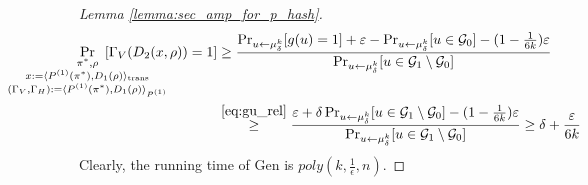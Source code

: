 \begin{proof}[Lemma \ref{lemma:sec_amp_for_p_hash}]
\begin{align}
   \label{eq:proof_final}
\underset{
  \mathclap{
  \substack{\pi^*, \rho \\ x := \langle P^{(1)}(\pi^*), D_1(\rho) \rangle_{\text{trans}}
    \\ (\Gamma_V, \Gamma_H) := \langle P^{(1)}(\pi^*), D_1 (\rho) \rangle_{P^{(1)}} }}}
{\Pr}\mkern13mu[\Gamma_V(D_2(x, \rho)) = 1]
 &\geq \frac{ {\Pr}_{u \leftarrow \mu_{\delta}^{k}}[g(u) = 1] + \epsilon -
 \Pr_{u \leftarrow \mu_{\delta}^{k}}[u \in \cG_0] - (1 - \frac{1}{6k})\epsilon} {\Pr_{u \leftarrow \mu_{\delta}^{k}}[u \in \cG_1 \setminus \cG_0]} \notag\\
 &\stackrel{\eqref{eq:gu_rel}}{\geq} \frac{\epsilon + \delta\Pr_{u \leftarrow \mu_{\delta}^{k}}[u \in \cG_1 \setminus \cG_0] - (1 - \frac{1}{6k})\epsilon}
{\Pr_{u \leftarrow \mu_{\delta}^{k}}[u \in \cG_1 \setminus \cG_0]} \geq \delta + \frac{\epsilon}{6k}
\end{align}
Clearly, the running time of Gen is $poly(k, \frac{1}{\epsilon}, n)$.
\end{proof}

%
